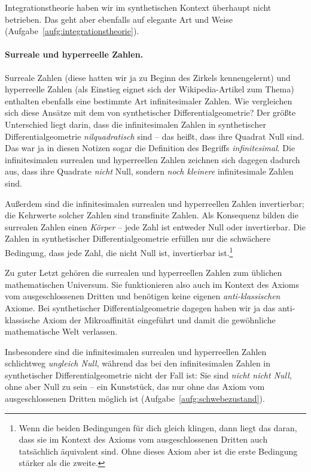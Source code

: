\documentclass[twoside]{../zirkelblatt}
\theoremstyle{definition}
\theoremstyle{plain}
\theoremstyle{remark}
\begin{document}
Integrationstheorie haben wir im synthetischen Kontext überhaupt nicht
betrieben. Das geht aber ebenfalls auf elegante Art und Weise
(Aufgabe~\ref{aufg:integrationstheorie}).


\paragraph{Surreale und hyperreelle Zahlen.}
Surreale Zahlen (diese hatten wir ja zu Beginn des Zirkels kennengelernt)
und hyperreelle Zahlen (als Einstieg eignet sich der Wikipedia-Artikel zum
Thema) enthalten ebenfalls eine bestimmte Art infinitesimaler Zahlen. Wie
vergleichen sich diese Ansätze mit dem von synthetischer Differentialgeometrie?
Der größte Unterschied liegt darin, dass die infinitesimalen Zahlen in
synthetischer Differentialgeometrie \emph{nilquadratisch} sind -- das heißt,
dass ihre Quadrat Null sind. Das war ja in diesen Notizen sogar die Definition des
Begriffs \emph{infinitesimal}. Die infinitesimalen surrealen und hyperreellen
Zahlen zeichnen sich dagegen dadurch aus, dass ihre Quadrate \emph{nicht} Null, sondern
\emph{noch kleinere} infinitesimale Zahlen sind.

Außerdem sind die infinitesimalen surrealen und hyperreellen Zahlen
invertierbar; die Kehrwerte solcher Zahlen sind transfinite Zahlen. Als
Konsequenz bilden die surrealen Zahlen einen \emph{Körper} -- jede Zahl ist
entweder Null oder invertierbar. Die Zahlen in synthetischer
Differentialgeometrie erfüllen nur die schwächere Bedingung, dass jede Zahl, die
nicht Null ist, invertierbar ist.\footnote{Wenn die beiden Bedingungen für dich
gleich klingen, dann liegt das daran, dass sie im Kontext des Axioms vom
ausgeschlossenen Dritten auch tatsächlich äquivalent sind. Ohne dieses Axiom
aber ist die erste Bedingung stärker als die zweite.}

Zu guter Letzt gehören die surrealen und hyperreellen Zahlen zum üblichen
mathematischen Universum. Sie funktionieren also auch im Kontext des Axioms vom
ausgeschlossenen Dritten und benötigen keine eigenen \emph{anti-klassischen}
Axiome. Bei synthetischer Differentialgeometrie dagegen haben wir ja das
anti-klassische Axiom der Mikroaffinität eingeführt und damit die gewöhnliche
mathematische Welt verlassen.

Insbesondere sind die infinitesimalen surrealen
und hyperreellen Zahlen schlichtweg \emph{ungleich Null}, während das bei den
infinitesimalen Zahlen in synthetischer Differentialgeometrie nicht der Fall
ist: Sie sind \emph{nicht nicht Null}, ohne aber Null zu sein -- ein
Kunststück, das nur ohne das Axiom vom ausgeschlossenen Dritten möglich ist
(Aufgabe~\ref{aufg:schwebezustand}).
\end{document}
